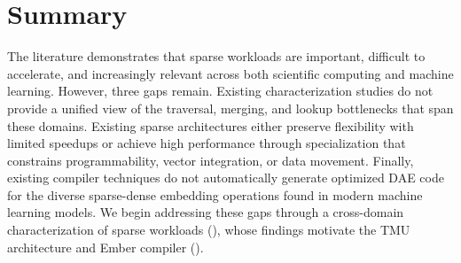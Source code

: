 \section{Summary} \label{sec:related-work-summary}
The literature demonstrates that sparse workloads are important, difficult to accelerate, and increasingly relevant across both scientific computing and machine learning. However, three gaps remain. Existing characterization studies do not provide a unified view of the traversal, merging, and lookup bottlenecks that span these domains. Existing sparse architectures either preserve flexibility with limited speedups or achieve high performance through specialization that constrains programmability, vector integration, or data movement. Finally, existing compiler techniques do not automatically generate optimized DAE code for the diverse sparse-dense embedding operations found in modern machine learning models. We begin addressing these gaps through a cross-domain characterization of sparse workloads (), whose findings motivate the TMU architecture and Ember compiler ().
